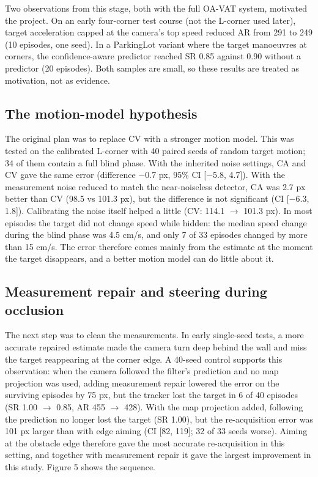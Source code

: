 \documentclass[12pt,a4paper]{article}
\begin{document}
Two observations from this stage, both with the full OA-VAT system, motivated the project. On an early four-corner test course (not the L-corner used later), target acceleration capped at the camera’s top speed reduced AR from 291 to 249 (10 episodes, one seed). In a ParkingLot variant where the target manoeuvres at corners, the confidence-aware predictor reached SR 0.85 against 0.90 without a predictor (20 episodes). Both samples are small, so these results are treated as motivation, not as evidence.

\subsection{The motion-model hypothesis}
The original plan was to replace CV with a stronger motion model. This was tested on the calibrated L-corner with 40 paired seeds of random target motion; 34 of them contain a full blind phase. With the inherited noise settings, CA and CV gave the same error (difference $-$0.7 px, 95\% CI [$-$5.8, 4.7]). With the measurement noise reduced to match the near-noiseless detector, CA was 2.7 px better than CV (98.5 vs 101.3 px), but the difference is not significant (CI [$-$6.3, 1.8]). Calibrating the noise itself helped a little (CV: 114.1 $\rightarrow$ 101.3 px). In most episodes the target did not change speed while hidden: the median speed change during the blind phase was 4.5 cm/s, and only 7 of 33 episodes changed by more than 15 cm/s. The error therefore comes mainly from the estimate at the moment the target disappears, and a better motion model can do little about it.

\subsection{Measurement repair and steering during occlusion}
The next step was to clean the measurements. In early single-seed tests, a more accurate repaired estimate made the camera turn deep behind the wall and miss the target reappearing at the corner edge.
A 40-seed control supports this observation: when the camera followed the filter's prediction and no map projection was used, adding measurement repair lowered the error on the surviving episodes by 75 px, but the tracker lost the target in 6 of 40 episodes (SR 1.00 $\rightarrow$ 0.85, AR 455 $\rightarrow$ 428).
With the map projection added, following the prediction no longer lost the target (SR 1.00), but the re-acquisition error was 101 px larger than with edge aiming (CI [82, 119]; 32 of 33 seeds worse).
Aiming at the obstacle edge therefore gave the most accurate re-acquisition in this setting, and together with measurement repair it gave the largest improvement in this study. Figure 5 shows the sequence.
\end{document}
